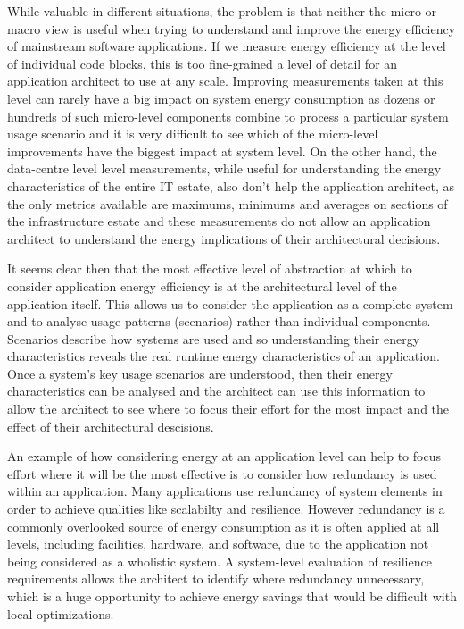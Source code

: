 While valuable in different situations, the problem is that neither the micro or macro view is useful when trying to understand and improve the energy efficiency of mainstream software applications.  If we measure energy efficiency at the level of individual code blocks, this is too fine-grained a level of detail for an application architect to use at any scale.  Improving measurements taken at this level can rarely have a big impact on system energy consumption as dozens or hundreds of such micro-level components combine to process a particular system usage scenario and it is very difficult to see which of the micro-level improvements have the biggest impact at system level.  On the other hand, the data-centre level level measurements, while useful for understanding the energy characteristics of the entire IT estate, also don't help the application architect, as the only metrics available are maximums, minimums and averages on sections of the infrastructure estate and these measurements do not allow an application architect to understand the energy implications of their architectural decisions.

It seems clear then that the most effective level of abstraction at which to consider application energy efficiency is at the architectural level of the application itself.  This allows us to consider the application as a complete system and to analyse usage patterns (scenarios) rather than individual components.  Scenarios describe how systems are used and so understanding their energy characteristics reveals the real runtime energy characteristics of an application.  Once a system's key usage scenarios are understood, then their energy characteristics can be analysed and the architect can use this information to allow the architect to see where to focus their effort for the most impact and the effect of their architectural descisions.

An example of how considering energy at an application level can help to focus effort where it will be the most effective is to consider how redundancy is used within an application.  Many applications use redundancy of system elements in order to achieve qualities like scalabilty and resilience.  However redundancy is a commonly overlooked source of energy consumption as it is often applied at all levels, including facilities, hardware, and software, due to the application not being considered as a wholistic system.   A system-level evaluation of resilience requirements allows the architect to identify where redundancy unnecessary, which is a huge opportunity to achieve energy savings that would be difficult with local optimizations.

